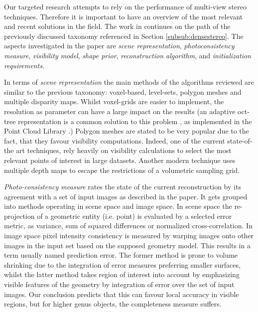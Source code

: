\documentclass{ucl_thesis}
\begin{document}
Our targeted research attempts to rely on the performance of multi-view stereo techniques. Therefore it is important to have an overview of the most relevant and recent solutions in the field. The work in \cite{Seitz:2006} continues on the path of the previously discussed taxonomy referenced in Section \ref{subsub:densestereo}. The aspects investigated in the paper are {\it scene representation}, {\it photoconsistency measure}, {\it visibility model}, \textit{shape prior}, \textit{reconstruction algorithm}, and {\it initialization requirements}.

\par In terms of {\it scene representation} the main methods of the algorithms reviewed are similar to the previous taxonomy: voxel-based, level-sets, polygon meshes and multiple disparity maps. Whilst voxel-grids are easier to implement, the resolution as parameter can have a large impact on the results (an adaptive oct-tree representation is a common solution to this problem \cite{jevans1989adaptive}, as implemented in the Point Cloud Library \cite{PCL}.) Polygon meshes are stated to be very popular due to the fact, that they favour visibility computations. Indeed, one of the current state-of-the art techniques, \cite{FurukawaCSS10} rely heavily on visibility calculations to select the most relevant points of interest in large datasets. Another modern technique \cite{Tola12} uses multiple depth maps to escape the restrictions of a volumetric sampling grid.

\par {\it Photo-consistency measure} rates the state of the current reconstruction by its agreement with a set of input images as described in the paper. It gets grouped into methods operating in scene space and image space. In scene space the re-projection of a geometric entity (i.e. point) is evaluated by a selected error metric, as variance, sum of squared differences or normalized cross-correlation. In image space pixel intensity consistency is measured by warping images onto other images in the input set based on the supposed geometry model. This results in a term usually named prediction error. The former method is prone to volume shrinking due to the integration of error measures preferring smaller surfaces, whilst the latter method takes region of interest into account by emphasizing visible features of the geometry by integration of error over the set of input images. Our conclusion predicts that this can favour local accuracy in visible regions, but for higher genus objects, the completeness measure suffers.
\end{document}
